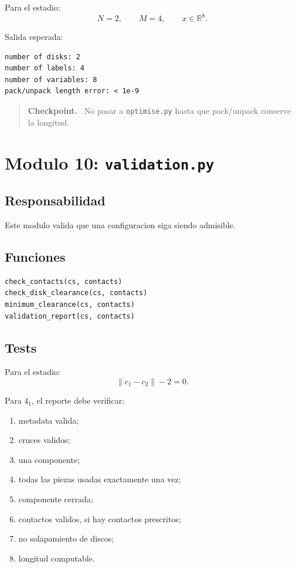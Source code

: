 \documentclass[11pt,letterpaper]{amsart}
\newcommand{\R}{\mathbb R}
\newenvironment{checkpoint}
{\par\medskip\noindent\begin{quote}\textbf{Checkpoint.}\ }
{\end{quote}\par\medskip}
\begin{document}
Para el estadio:
\[
N=2,\qquad M=4,\qquad x\in\R^8.
\]

Salida esperada:
\begin{verbatim}
number of disks: 2
number of labels: 4
number of variables: 8
pack/unpack length error: < 1e-9
\end{verbatim}

\begin{checkpoint}
No pasar a \texttt{optimise.py} hasta que pack/unpack conserve la longitud.
\end{checkpoint}

\section{Modulo 10: \texttt{validation.py}}

\subsection{Responsabilidad}

Este modulo valida que una configuracion siga siendo admisible.

\subsection{Funciones}

\begin{verbatim}
check_contacts(cs, contacts)
check_disk_clearance(cs, contacts)
minimum_clearance(cs, contacts)
validation_report(cs, contacts)
\end{verbatim}

\subsection{Tests}

Para el estadio:
\[
\|c_1-c_2\|-2=0.
\]

Para \(4_1\), el reporte debe verificar:

\begin{enumerate}[label=\textbf{\arabic*.}]
\item metadata valida;
\item cruces validos;
\item una componente;
\item todas las piezas usadas exactamente una vez;
\item componente cerrada;
\item contactos validos, si hay contactos prescritos;
\item no solapamiento de discos;
\item longitud computable.
\end{enumerate}
\end{document}
